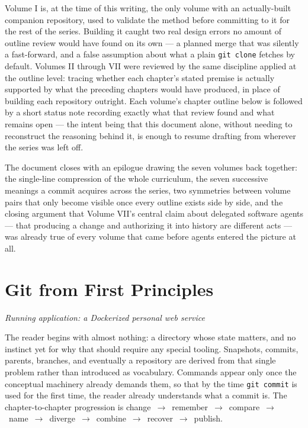\documentclass[11pt]{book}
\newcommand{\subheading}[1]{\bigskip\noindent{\bfseries\itshape #1}\smallskip\par}
\begin{document}
Volume I is, at the time of this writing, the only volume with an actually-built companion repository, used to validate the method before committing to it for the rest of the series. Building it caught two real design errors no amount of outline review would have found on its own — a planned merge that was silently a fast-forward, and a false assumption about what a plain \texttt{git clone} fetches by default. Volumes II through VII were reviewed by the same discipline applied at the outline level: tracing whether each chapter's stated premise is actually supported by what the preceding chapters would have produced, in place of building each repository outright. Each volume's chapter outline below is followed by a short status note recording exactly what that review found and what remains open — the intent being that this document alone, without needing to reconstruct the reasoning behind it, is enough to resume drafting from wherever the series was left off.

The document closes with an epilogue drawing the seven volumes back together: the single-line compression of the whole curriculum, the seven successive meanings a commit acquires across the series, two symmetries between volume pairs that only become visible once every outline exists side by side, and the closing argument that Volume VII's central claim about delegated software agents — that producing a change and authorizing it into history are different acts — was already true of every volume that came before agents entered the picture at all.

\tableofcontents

\chapter{Git from First Principles}
\textit{Running application: a Dockerized personal web service}

\subheading{Governing Idea}
The reader begins with almost nothing: a directory whose state matters, and no instinct yet for why that should require any special tooling. Snapshots, commits, parents, branches, and eventually a repository are derived from that single problem rather than introduced as vocabulary. Commands appear only once the conceptual machinery already demands them, so that by the time \texttt{git commit} is used for the first time, the reader already understands what a commit is. The chapter-to-chapter progression is change~$\to$~remember~$\to$~compare~$\to$~name~$\to$~diverge~$\to$~combine~$\to$~recover~$\to$~publish.
\end{document}
